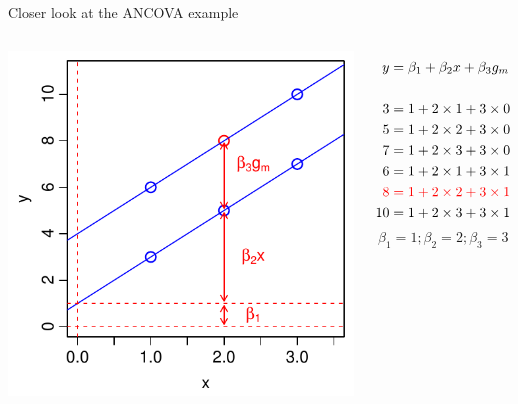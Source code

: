 \documentclass[xcolor=x11names,compress]{beamer}
\renewcommand{\(}{\begin{columns}}
\renewcommand{\)}{\end{columns}}
\newcommand{\<}[1]{\begin{column}{#1}}
\renewcommand{\>}{\end{column}}
\begin{document}
\begin{frame}{Closer look at the ANCOVA example}

    \begin{columns}[T]
    
            \includegraphics[width=\textwidth]{TwoVarsHighlight.pdf}
            
                \begin{align*}
                  y  &= \beta_1  + \beta_2 x + \beta_3 g_m\\
                  \\
                  3   & = 1 + 2 \times 1 + 3 \times 0\\
                  5   & = 1 + 2 \times 2 + 3 \times 0\\
                  7   & = 1 + 2 \times 3 + 3 \times 0\\
                  6   & = 1 + 2 \times 1 + 3 \times 1\\  
                  {\color{red}8} & {\color{red}\;= 1 + 2 \times 2 + 3 \times 1}\\ %
                  10  & = 1 + 2 \times 3 + 3 \times 1
                \end{align*}
                \[\beta_1 = 1; \beta_2=2; \beta_3=3\]
    \end{columns}
    \end{frame}
    
\end{document}
